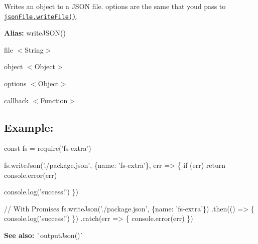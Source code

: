 Writes an object to a J\+S\+ON file. {\ttfamily options} are the same that you\textquotesingle{}d pass to \href{https://github.com/jprichardson/node-jsonfile#writefilefilename-options-callback}{\tt {\ttfamily json\+File.\+write\+File()}}.

{\bfseries Alias\+:} {\ttfamily write\+J\+S\+O\+N()}


\begin{DoxyItemize}
\item {\ttfamily file} {\ttfamily $<$String$>$}
\item {\ttfamily object} {\ttfamily $<$Object$>$}
\item {\ttfamily options} {\ttfamily $<$Object$>$}
\item {\ttfamily callback} {\ttfamily $<$Function$>$}
\end{DoxyItemize}

\subsection*{Example\+:}


\begin{DoxyCode}
const fs = require('fs-extra')

fs.writeJson('./package.json', \{name: 'fs-extra'\}, err => \{
  if (err) return console.error(err)

  console.log('success!')
\})

// With Promises
fs.writeJson('./package.json', \{name: 'fs-extra'\})
.then(() => \{
  console.log('success!')
\})
.catch(err => \{
  console.error(err)
\})
\end{DoxyCode}
 



{\bfseries See also\+:} \`{}output\+Json()\`{} 